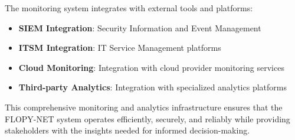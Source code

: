 The monitoring system integrates with external tools and platforms:

\begin{itemize}
    \item \textbf{SIEM Integration}: Security Information and Event Management
    \item \textbf{ITSM Integration}: IT Service Management platforms
    \item \textbf{Cloud Monitoring}: Integration with cloud provider monitoring services
    \item \textbf{Third-party Analytics}: Integration with specialized analytics platforms
\end{itemize}

This comprehensive monitoring and analytics infrastructure ensures that the FLOPY-NET system operates efficiently, securely, and reliably while providing stakeholders with the insights needed for informed decision-making.
